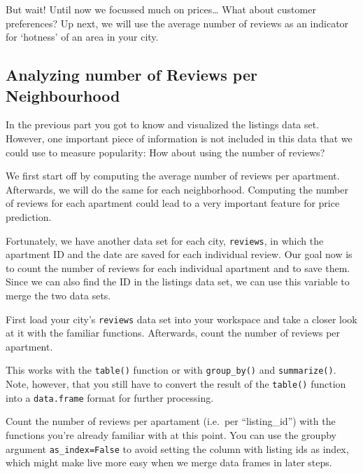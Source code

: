 \documentclass[
  11pt,
]{article}
\newenvironment{tips}[1]
  {
  \begin{itemize}
  \footnotesize
  \renewcommand{\labelitemi}{
    \raisebox{-.7\height}[0pt][0pt]{
      {\setkeys{Gin}{width=3em,keepaspectratio}
        \texttt{[image: images/\#1.png]}}
    }
  }
  \setlength{\fboxsep}{1em}
  \begin{rbox}
  \item
  }
  {
  \end{rbox}
  \end{itemize}
  }
\newenvironment{tipsp}[1]
  {
  \begin{itemize}
  \footnotesize
  \renewcommand{\labelitemi}{
    \raisebox{-.7\height}[0pt][0pt]{
      {\setkeys{Gin}{width=3em,keepaspectratio}
        \texttt{[image: images/\#1.png]}}
    }
  }
  \setlength{\fboxsep}{1em}
  \begin{pbox}
  \item
  }
  {
  \end{pbox}
  \end{itemize}
  }
\begin{document}
But wait! Until now we focussed much on prices\ldots{} What about customer preferences? Up next, we will use the average number of reviews as an indicator for `hotness' of an area in your city.

\hypertarget{analyzing-number-of-reviews-per-neighbourhood}{%
\subsection{Analyzing number of Reviews per Neighbourhood}\label{analyzing-number-of-reviews-per-neighbourhood}}

In the previous part you got to know and visualized the listings data set. However, one important piece of information is not included in this data that we could use to measure popularity: How about using the number of reviews?

We first start off by computing the average number of reviews per apartment. Afterwards, we will do the same for each neighborhood. Computing the number of reviews for each apartment could lead to a very important feature for price prediction.

Fortunately, we have another data set for each city, \texttt{reviews}, in which the apartment ID and the date are saved for each individual review. Our goal now is to count the number of reviews for each individual apartment and to save them. Since we can also find the ID in the listings data set, we can use this variable to merge the two data sets.

First load your city's \texttt{reviews} data set into your workspace and take a closer look at it with the familiar functions. Afterwards, count the number of reviews per apartment.

\begin{tips}r
This works with the \texttt{table()} function or with \texttt{group\_by()} and \texttt{summarize()}. Note, however, that you still have to convert the result of the \texttt{table()} function into a \texttt{data.frame} format for further processing.

\end{tips}

\begin{tipsp}p
Count the number of reviews per apartament (i.e.~per ``listing\_id'') with the functions you're already familiar with at this point. You can use the groupby argument \texttt{as\_index=False} to avoid setting the column with listing ids as index, which might make live more easy when we merge data frames in later steps.

\end{tipsp}
\end{document}

